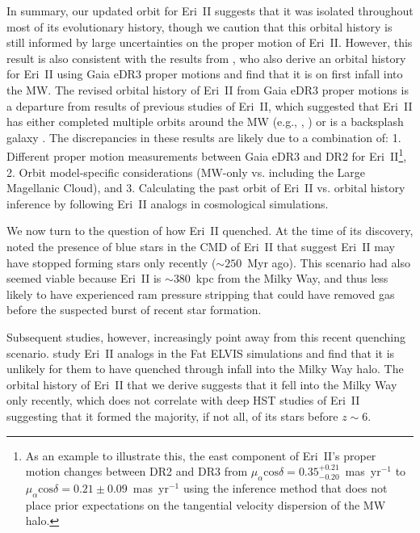 \documentclass[twocolumn]{aastex63}
\begin{document}
\par In summary, our updated orbit for Eri~II suggests that it was isolated throughout most of its evolutionary history, though we caution that this orbital history is still informed by large uncertainties on the proper motion of Eri~II. However, this result is also consistent with the results from \citet{battaglia2021}, who also derive an orbital history for Eri~II using Gaia eDR3 proper motions and find that it is on first infall into the MW. The revised orbital history of Eri~II from Gaia eDR3 proper motions is a departure from results of previous studies of Eri~II, which suggested that Eri~II has either completed multiple orbits around the MW (e.g., \citealt{li2017eriII}, \citealt{fritz2018}) or is a backsplash galaxy \citep{buck2019}. The discrepancies in these results are likely due to a combination of: 1. Different proper motion measurements between Gaia eDR3 and DR2 for Eri~II\footnote{As an example to illustrate this, the east component of Eri~II's proper motion changes between DR2 \citep{mcconnachie2020dr2} and DR3 \citep{mcconnachie21b} from $\mu_{\alpha}\mbox{cos}\delta=0.35^{+0.21}_{-0.20}$~mas~yr$^{-1}$ to $\mu_{\alpha}\mbox{cos}\delta=0.21\pm0.09$~mas~yr$^{-1}$ using the inference method that does not place prior expectations on the tangential velocity dispersion of the MW halo.}, 2. Orbit model-specific considerations (MW-only vs. including the Large Magellanic Cloud), and 3. Calculating the past orbit of Eri~II vs. orbital history inference by following Eri~II analogs in cosmological simulations.

\par We now turn to the question of how Eri~II quenched. At the time of its discovery, \citet{koposov2015DESsat} noted the presence of blue stars in the CMD of Eri~II that suggest Eri~II may have stopped forming stars only recently ($\sim250$~Myr ago). This scenario had also seemed viable because Eri~II is $\sim380$~kpc from the Milky Way, and thus less likely to have experienced ram pressure stripping that could have removed gas before the suspected burst of recent star formation. 

\par Subsequent studies, however, increasingly point away from this recent quenching scenario. \citet{rodriguezwimberly2019reionization} study Eri~II analogs in the Fat ELVIS simulations and find that it is unlikely for them to have quenched through infall into the Milky Way halo. The orbital history of Eri~II that we derive suggests that it fell into the Milky Way only recently, which does not correlate with deep HST studies of Eri~II suggesting that it formed the majority, if not all, of its stars before $z \sim 6$. 
\end{document}

